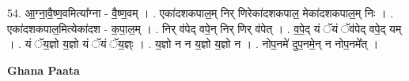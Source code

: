 \documentclass[17pt]{extarticle}
\begin{document}
54. आ॒ग्ना॒वै॒ष्ण॒वमित्या᳚ग्ना - वै॒ष्ण॒वम् । . एका॑दशकपाल॒म् निर् णिरेका॑दशकपाल॒ मेका॑दशकपाल॒म् निः । . एका॑दशकपाल॒मित्येका॑दश - क॒पा॒ल॒म् । . निर् व॑पेद् वपे॒न् निर् णिर् व॑पेत् । . व॒पे॒द् यं ॅयं ॅव॑पेद् वपे॒द् यम् । . यं ॅय॒ज्ञो य॒ज्ञो यं ॅयं ॅय॒ज्ञ्ः । . य॒ज्ञो न न य॒ज्ञो य॒ज्ञो न । . नोप॒नमे॑ दुप॒नमे॒न् न नोप॒नमे᳚त् । \newline

\textbf{Ghana Paata } \newline
\end{document}
